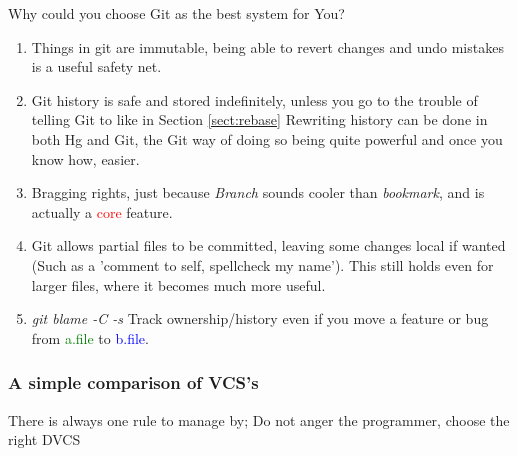Why could you choose Git as the best system for You?
\begin{enumerate}
\item
Things in git are immutable, being able to revert changes and undo mistakes is a useful safety net.

\item
Git history is safe and stored indefinitely, unless you go to the trouble of telling Git to like in Section \ref{sect:rebase}
Rewriting history can be done in both Hg and Git, the Git way of doing so being quite powerful and once you know how, easier.

\item
Bragging rights, just because \textit{Branch} sounds cooler than \textit{bookmark}, and is actually a \textcolor{red}{core} feature.

\item
Git allows partial files to be committed, leaving some changes local if wanted (Such as a 'comment to self, spellcheck my name').
This still holds even for larger files, where it becomes much more useful.

\item
\large{\textit{git blame -C -s}}
Track ownership/history even if you move a feature or bug from \textcolor{green}{a.file} to \textcolor{blue}{b.file}.


\end{enumerate}


\subsubsection{A simple comparison of VCS's}
There is always one rule to manage by;
Do not anger the programmer, choose the right DVCS


